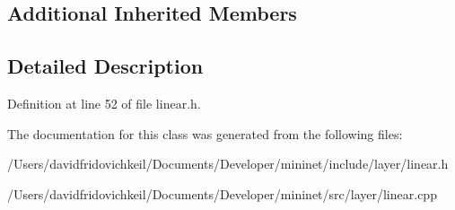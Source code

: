 \subsection*{Additional Inherited Members}


\subsection{Detailed Description}


Definition at line 52 of file linear.\+h.



The documentation for this class was generated from the following files\+:\begin{DoxyCompactItemize}
\item 
/\+Users/davidfridovichkeil/\+Documents/\+Developer/mininet/include/layer/linear.\+h\item 
/\+Users/davidfridovichkeil/\+Documents/\+Developer/mininet/src/layer/linear.\+cpp\end{DoxyCompactItemize}
